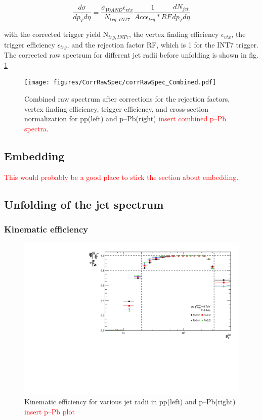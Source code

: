\documentclass[ALICE]{ALICE_analysis_notes}
\newcommand{\pPb}{{\mbox{p--Pb}}\xspace}
\newcommand{\pp}{pp\xspace}
\begin{document}
\begin{equation}
   \frac{d\sigma}{dp_T d\eta} = \frac{\sigma_{V0AND}\epsilon_{vtx}}{N_{trg,INT7}} \frac{1}{Acc\epsilon_{trg}*RF} \frac{dN_{jet}}{dp_T d\eta}
\end{equation}

with the corrected trigger yield N$_{trg,INT7}$, the vertex finding efficiency $\epsilon_{vtx}$, the trigger efficiency $\epsilon_{trg}$, and the rejection factor RF, which is 1 for the INT7 trigger. The corrected raw spectrum for different jet radii before unfolding is shown in fig. \ref{fig:CombinedRawSpec}

\begin{figure}
    \centering
    \texttt{[image: figures/CorrRawSpec/corrRawSpec\_Combined.pdf]}
    \vfill\null
    \caption{Combined raw spectrum after corrections for the rejection factors, vertex finding efficiency, trigger efficiency, and cross-section normalization for \pp (left) and \pPb (right) \textcolor{red}{insert combined \pPb spectra}.}
    \label{fig:CombinedRawSpec}
\end{figure}

\subsection{Embedding}
\label{sec:embedding}

\textcolor{red}{This would probably be a good place to stick the section about embedding.}

\subsection{Unfolding of the jet spectrum}
\label{sec:unfolding}
\subsubsection{Kinematic efficiency}
\label{subsec:kinEff}

\begin{figure}
    \centering
    \includegraphics[width=15cm]{figures/KinematicEfficiency/EffKine.pdf}
    \caption{Kinematic efficiency for various jet radii in \pp (left) and \pPb (right) \textcolor{red}{insert \pPb plot}}
    \label{fig:KinematicEfficiency}
\end{figure}
\end{document}
